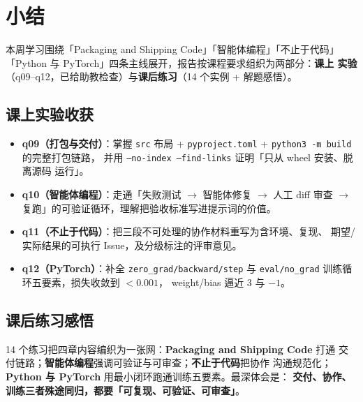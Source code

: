 \documentclass{hamesome-report}
\begin{document}
\section{小结}
本周学习围绕「Packaging and Shipping Code」「智能体编程」「不止于代码」
「Python 与 PyTorch」四条主线展开，报告按课程要求组织为两部分：\textbf{课上
实验}（q09–q12，已给助教检查）与\textbf{课后练习}（14 个实例 + 解题感悟）。

\subsection{课上实验收获}
\begin{itemize}
  \item \textbf{q09（打包与交付）}：掌握 \texttt{src} 布局 +
        \texttt{pyproject.toml} + \texttt{python3 -m build} 的完整打包链路，
        并用 \texttt{--no-index --find-links} 证明「只从 wheel 安装、脱离源码
        运行」。
  \item \textbf{q10（智能体编程）}：走通「失败测试 $\to$ 智能体修复 $\to$ 人工
        diff 审查 $\to$ 复跑」的可验证循环，理解把验收标准写进提示词的价值。
  \item \textbf{q11（不止于代码）}：把三段不可处理的协作材料重写为含环境、复现、
        期望/实际结果的可执行 Issue，及分级标注的评审意见。
  \item \textbf{q12（PyTorch）}：补全 \texttt{zero\_grad/backward/step} 与
        \texttt{eval/no\_grad} 训练循环五要素，损失收敛到 $<0.001$，
        weight/bias 逼近 3 与 $-1$。
\end{itemize}

\subsection{课后练习感悟}
14 个练习把四章内容编织为一张网：\textbf{Packaging and Shipping Code} 打通
交付链路；\textbf{智能体编程}强调可验证与可审查；\textbf{不止于代码}把协作
沟通规范化；\textbf{Python 与 PyTorch} 用最小闭环跑通训练五要素。最深体会是：
\textbf{交付、协作、训练三者殊途同归，都要「可复现、可验证、可审查」}。
\end{document}
